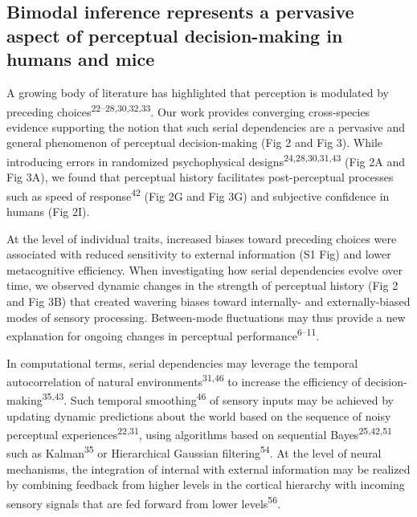 \documentclass[
]{article}
\begin{document}
\hypertarget{bimodal-inference-represents-a-pervasive-aspect-of-perceptual-decision-making-in-humans-and-mice}{%
\subsection{Bimodal inference represents a pervasive aspect of
perceptual decision-making in humans and
mice}\label{bimodal-inference-represents-a-pervasive-aspect-of-perceptual-decision-making-in-humans-and-mice}}

A growing body of literature has highlighted that perception is
modulated by preceding choices\textsuperscript{22--28,30,32,33}. Our
work provides converging cross-species evidence supporting the notion
that such serial dependencies are a pervasive and general phenomenon of
perceptual decision-making (Fig 2 and Fig 3). While introducing errors
in randomized psychophysical designs\textsuperscript{24,28,30,31,43}
(Fig 2A and Fig 3A), we found that perceptual history facilitates
post-perceptual processes such as speed of response\textsuperscript{42}
(Fig 2G and Fig 3G) and subjective confidence in humans (Fig 2I).

At the level of individual traits, increased biases toward preceding
choices were associated with reduced sensitivity to external information
(S1 Fig) and lower metacognitive efficiency. When
investigating how serial dependencies evolve over time, we observed
dynamic changes in the strength of perceptual history (Fig 2 and Fig 3B)
that created wavering biases toward internally- and externally-biased
modes of sensory processing. Between-mode fluctuations may thus provide
a new explanation for ongoing changes in perceptual
performance\textsuperscript{6--11}.

In computational terms, serial dependencies may leverage the temporal
autocorrelation of natural environments\textsuperscript{31,46} to
increase the efficiency of decision-making\textsuperscript{35,43}. Such
temporal smoothing\textsuperscript{46} of sensory inputs may be achieved
by updating dynamic predictions about the world based on the sequence of
noisy perceptual experiences\textsuperscript{22,31}, using algorithms
based on sequential Bayes\textsuperscript{25,42,51} such as
Kalman\textsuperscript{35} or Hierarchical Gaussian
filtering\textsuperscript{54}. At the level of neural mechanisms, the
integration of internal with external information may be realized by
combining feedback from higher levels in the cortical hierarchy with
incoming sensory signals that are fed forward from lower
levels\textsuperscript{56}.
\end{document}
